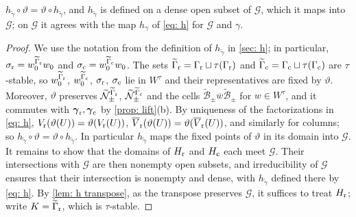\documentclass[a4paper]{amsart}
\numberwithin{equation}{section}
\theoremstyle{definition}
\theoremstyle{remark}
\newcommand{\mcG}{\mathcal{G}}
\newcommand{\mcN}{\mathcal{N}}
\newcommand{\mcB}{\mathcal{B}}
\newcommand{\tg}{\widetilde{\gamma}}
\newcommand{\vt}{\vartheta}
\newcommand{\rr}{{\rm r}}
\newcommand{\cc}{{\rm c}}
\begin{document}
\begin{proposition}
  \label{prop: h theta}
  $h_{\tg}\circ\vt=\vt\circ h_{\tg}$, and $h_{\tg}$ is defined on a dense open subset of $\mcG$, which it maps into $\mcG$; on $\mcG$ it agrees with the map $h_\gamma$ of \eqref{eq: h} for $\mcG$ and $\gamma$.
\end{proposition}
\begin{proof}
  We use the notation from the definition of $h_{\tg}$ in \cref{sec: h}; in particular, $\sigma_{\rr}=w_0^{\widetilde{\Gamma}_{\rr}}w_0$ and $\sigma_{\cc}=w_0^{\widetilde{\Gamma}_{\cc}}w_0$.
  The sets $\widetilde{\Gamma}_{\rr}=\Gamma_{\rr}\sqcup\tau(\Gamma_{\rr})$ and $\widetilde{\Gamma}_{\cc}=\Gamma_{\cc}\sqcup\tau(\Gamma_{\cc})$ are $\tau$-stable, so $w_0^{\widetilde{\Gamma}_{\rr}}$, $w_0^{\widetilde{\Gamma}_{\cc}}$, $\sigma_{\rr}$, $\sigma_{\cc}$ lie in $W^\tau$ and their representatives are fixed by $\vt$. Moreover, $\vt$ preserves $\widetilde{\mcN}_\pm^{\widetilde{\Gamma}_{\rr}}$, $\widetilde{\mcN}_\pm^{\widetilde{\Gamma}_{\cc}}$ and the cells $\widetilde{\mcB}_\pm\overline{w}\widetilde{\mcB}_\pm$ for $w\in W^\tau$, and it commutes with $\boldsymbol\gamma_{\rr},\boldsymbol\gamma_{\cc}$ by \cref{prop: lift}(b).
  By uniqueness of the factorizations in \eqref{eq: h}, $V_{\rr}(\vt(U))=\vt(V_{\rr}(U))$, $\overline{V}_{\rr}(\vt(U))=\vt(\overline{V}_{\rr}(U))$, and similarly for columns; so $h_{\tg}\circ\vt=\vt\circ h_{\tg}$.
  In particular $h_{\tg}$ maps the fixed points of $\vt$ in its domain into $\mcG$.
  It remains to show that the domains of $H_{\rr}$ and $H_{\cc}$ each meet $\mcG$. Their intersections with $\mcG$ are then nonempty open subsets, and irreducibility of $\mcG$ ensures that their intersection is nonempty and dense, with $h_{\tg}$ defined there by \eqref{eq: h}.
  By \cref{lem: h transpose}, as the transpose preserves $\mcG$, it suffices to treat $H_{\rr}$; write $K=\widetilde{\Gamma}_{\rr}$, which is $\tau$-stable.


\end{proof}
\end{document}
